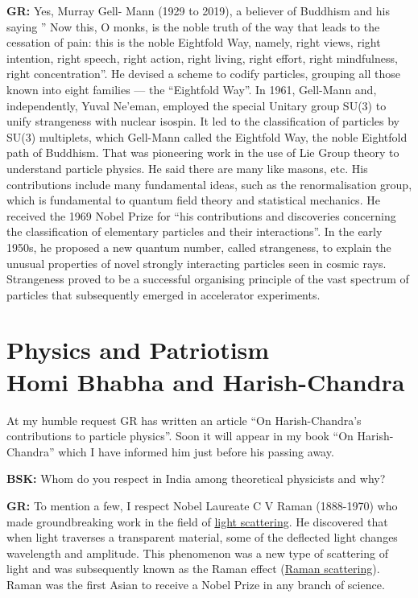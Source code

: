 \textbf{GR:} Yes, Murray Gell- Mann (1929 to 2019), a believer of Buddhism and his saying  ” Now this, O monks, is the noble truth of the way that leads to the cessation of pain: this is the noble Eightfold Way, namely, right views, right intention, right speech, right action, right living, right effort, right mindfulness, right concentration”. He devised a scheme to codify particles, grouping all those known into eight families — the “Eightfold Way”. In 1961, Gell-Mann and, independently, Yuval Ne’eman, employed the special Unitary group SU(3) to unify strangeness with nuclear isospin. It led to the classification of particles by SU(3) multiplets, which Gell-Mann called the Eightfold Way, the noble Eightfold path of Buddhism. That was pioneering work in the use of Lie Group theory to understand particle physics. He said there are many like masons, etc. His contributions include many   fundamental ideas, such as the renormalisation group, which is fundamental to quantum field theory and statistical mechanics.  He received the 1969 Nobel Prize for “his contributions and discoveries concerning the classification of elementary particles and their interactions”. In the early 1950s, he proposed a new quantum number, called strangeness, to explain the unusual properties of novel strongly interacting particles seen in cosmic rays. Strangeness proved to be a successful organising principle of the vast spectrum of particles that subsequently emerged in accelerator experiments.

\section*{Physics and Patriotism\\ {\large Homi Bhabha and Harish-Chandra}}

At my humble request GR has written an article \cite{chap13-key04GR} “On Harish-Chandra's contributions to particle physics”. Soon it will appear in my book “On Harish-Chandra” which I have informed him just before his passing away.

\textbf{BSK:} Whom do you respect in India among theoretical physicists and why?

\textbf{GR:} To mention a few, I respect Nobel Laureate C V Raman (1888-1970) who made groundbreaking work in the field of \underline{light scattering}. He discovered that when light traverses a transparent material, some of the deflected light changes wavelength and amplitude. This phenomenon was a new type of scattering of light and was subsequently known as the Raman effect (\underline{Raman scattering}). Raman was the first Asian to receive a Nobel Prize in any branch of science.

